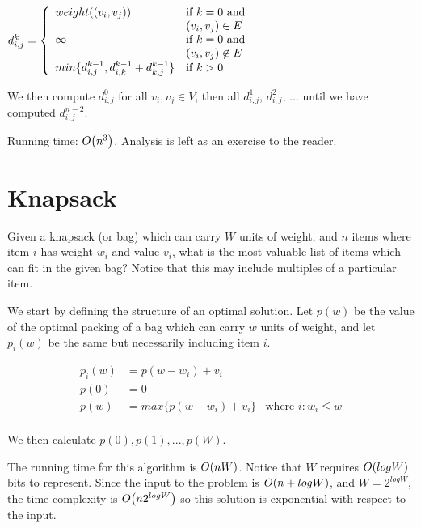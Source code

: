 \begin{math}
  d^k_{i,j} = \left\{
    \begin{array}{l l}
      weight((v_i,v_j)) & \text{if $k=0$ and} \\
                        & (v_i,v_j) \in E \\
      \infty            & \text{if $k=0$ and} \\
                        & (v_i,v_j) \not \in E \\
      min \{ d^{k-1}_{i,j},d^{k-1}_{i,k} + d^{k-1}_{k,j} \} & \text{if $k>0$}
    \end{array} \right.
\end{math}

We then compute $d^0_{i,j}$ for all $v_i,v_j \in V$, then all
$d^1_{i,j}$, $d^2_{i,j}$, ... until we have computed $d^{n-2}_{i,j}$.

Running time: $O\!\left(n^3\right)$.  Analysis is left as an exercise to the
reader.

\section{Knapsack}

Given a knapsack (or bag) which can carry $W$ units of weight, and $n$
items where item $i$ has weight $w_i$ and value $v_i$, what is the
most valuable list of items which can fit in the given bag?  Notice
that this may include multiples of a particular item.

We start by defining the structure of an optimal solution.  Let $p(w)$
be the value of the optimal packing of a bag which can carry $w$ units
of weight, and let $p_i(w)$ be the same but necessarily including item
$i$.

\begin{align*}
  p_i(w) &= p(w - w_i) + v_i & \\
  p(0)   &= 0 & \\
  p(w)   &= max \{ p(w - w_i) + v_i \} & \text{where $i : w_i \leq w$} \\
\end{align*}

We then calculate $p(0), p(1), ..., p(W)$.

The running time for this algorithm is $O\!\left(nW\right)$.  Notice that $W$
requires $O\!\left(logW\right)$ bits to represent.  Since the input to the
problem is $O\!\left(n + logW\right)$, and $W = 2^{logW}$, the time complexity
is $O\!\left(n2^{logW}\right)$ so this solution is exponential with respect to
the input.

